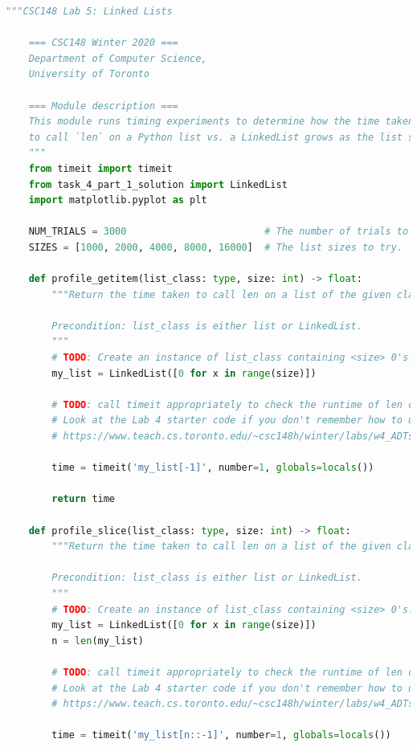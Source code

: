 \documentclass[12pt]{article}
\begin{document}
\begin{mdframed}
    \begin{lstlisting}[language=python,caption={task\_4\_part\_2\_solution.py}]
    """CSC148 Lab 5: Linked Lists

    === CSC148 Winter 2020 ===
    Department of Computer Science,
    University of Toronto

    === Module description ===
    This module runs timing experiments to determine how the time taken
    to call `len` on a Python list vs. a LinkedList grows as the list size grows.
    """
    from timeit import timeit
    from task_4_part_1_solution import LinkedList
    import matplotlib.pyplot as plt

    NUM_TRIALS = 3000                        # The number of trials to run.
    SIZES = [1000, 2000, 4000, 8000, 16000]  # The list sizes to try.

    def profile_getitem(list_class: type, size: int) -> float:
        """Return the time taken to call len on a list of the given class and size.

        Precondition: list_class is either list or LinkedList.
        """
        # TODO: Create an instance of list_class containing <size> 0's.
        my_list = LinkedList([0 for x in range(size)])

        # TODO: call timeit appropriately to check the runtime of len on the list.
        # Look at the Lab 4 starter code if you don't remember how to use timeit:
        # https://www.teach.cs.toronto.edu/~csc148h/winter/labs/w4_ADTs/starter-code/timequeue.py

        time = timeit('my_list[-1]', number=1, globals=locals())

        return time

    def profile_slice(list_class: type, size: int) -> float:
        """Return the time taken to call len on a list of the given class and size.

        Precondition: list_class is either list or LinkedList.
        """
        # TODO: Create an instance of list_class containing <size> 0's.
        my_list = LinkedList([0 for x in range(size)])
        n = len(my_list)

        # TODO: call timeit appropriately to check the runtime of len on the list.
        # Look at the Lab 4 starter code if you don't remember how to use timeit:
        # https://www.teach.cs.toronto.edu/~csc148h/winter/labs/w4_ADTs/starter-code/timequeue.py

        time = timeit('my_list[n::-1]', number=1, globals=locals())


\end{lstlisting}
\end{mdframed}
\end{document}
